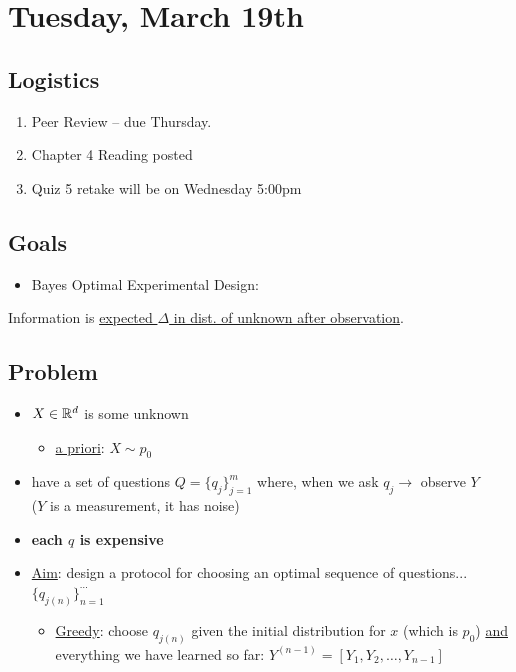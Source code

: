 \section{Tuesday, March 19th}
\subsection{Logistics}
\begin{enumerate}
    \item Peer Review -- due Thursday.
    \item Chapter 4 Reading posted
    \item Quiz 5 retake will be on Wednesday 5:00pm
\end{enumerate}
\subsection{Goals}
\begin{itemize}
    \item Bayes Optimal Experimental Design: 
\end{itemize}
\begin{shaded}
Information is \underline{expected $\Delta$ in dist. of unknown after observation}.
\end{shaded}


\subsection{Problem}
\begin{itemize}
    \item $X\in\mathbb{R}^d$ is some unknown
    \begin{itemize}
        \item \underline{a priori}: $X\sim p_0$
    \end{itemize}
    \item have a set of questions $Q=\{q_j\}_{j=1}^m$ where, when we ask $q_j\to$ observe $Y$\\
($Y$ is a measurement, it has noise)
    \item \textbf{each $q$ is expensive}
\end{itemize}


\begin{itemize}
    \item \underline{Aim}: design a protocol for choosing an optimal sequence of questions... $\{q_{j(n)}\}_{n=1}^{\cdots}$
    \begin{itemize}
        \item \underline{Greedy}: choose $q_{j(n)}$ given the initial distribution for $x$ (which is $p_0$) \underline{and} everything we have learned so far: $Y^{(n-1)}=[Y_1, Y_2, \ldots, Y_{n-1}]$
    \end{itemize}
\end{itemize}


